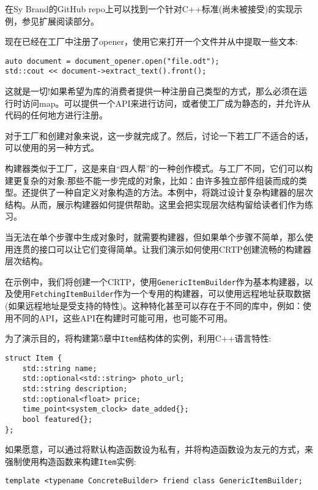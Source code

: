 在Sy Brand的GitHub repo上可以找到一个针对C++标准(尚未被接受)的实现示例，参见扩展阅读部分。

现在已经在工厂中注册了opener，使用它来打开一个文件并从中提取一些文本:

\begin{lstlisting}[style=styleCXX]
auto document = document_opener.open("file.odt");
std::cout << document->extract_text().front();
\end{lstlisting}

这就是一切!如果希望为库的消费者提供一种注册自己类型的方式，那么必须在运行时访问map。可以提供一个API来进行访问，或者使工厂成为静态的，并允许从代码的任何地方进行注册。

对于工厂和创建对象来说，这一步就完成了。然后，讨论一下若工厂不适合的话，可以使用的另一种方式。


构建器类似于工厂，这是来自“四人帮”的一种创作模式。与工厂不同，它们可以构建更复杂的对象:那些不能一步完成的对象，比如：由许多独立部件组装而成的类型。还提供了一种自定义对象构造的方法。本例中，将跳过设计复杂构建器的层次结构。从而，展示构建器如何提供帮助。这里会把实现层次结构留给读者们作为练习。

当无法在单个步骤中生成对象时，就需要构建器，但如果单个步骤不简单，那么使用连贯的接口可以让它们变得简单。让我们演示如何使用CRTP创建流畅的构建器层次结构。

在示例中，我们将创建一个CRTP，使用\texttt{GenericItemBuilder}作为基本构建器，以及使用\texttt{FetchingItemBuilder}作为一个专用的构建器，可以使用远程地址获取数据(如果远程地址是受支持的特性)。这种特化甚至可以存在于不同的库中，例如：使用不同的API，这些API在构建时可能可用，也可能不可用。

为了演示目的，将构建第5章中\texttt{Item}结构体的实例，利用C++语言特性:

\begin{lstlisting}[style=styleCXX]
struct Item {
	std::string name;
	std::optional<std::string> photo_url;
	std::string description;
	std::optional<float> price;
	time_point<system_clock> date_added{};
	bool featured{};
};
\end{lstlisting}

如果愿意，可以通过将默认构造函数设为私有，并将构造函数设为友元的方式，来强制使用构造函数来构建\texttt{Item}实例:

\begin{lstlisting}[style=styleCXX]
template <typename ConcreteBuilder> friend class GenericItemBuilder;
\end{lstlisting}

